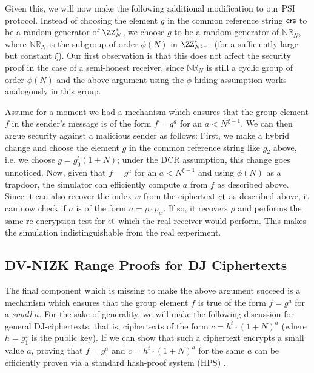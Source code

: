 Given this, we will now make the following additional modification to our PSI protocol. Instead of choosing the element $g$ in the common reference string $\mathsf{crs}$ to be a random generator of $\ZZ_N^\ast$, we choose $g$ to be a random generator of $\mathbb{NR}_N$, where $\mathbb{NR}_N$ is the subgroup of order $\phi(N)$ in $\ZZ_{N^{\xi + 1}}^\ast$ (for a sufficiently large but constant $\xi$). Our first observation is  that this does not affect the security proof in the case of a semi-honest receiver, since $\mathbb{NR}_N$ is still a cyclic group of order $\phi(N)$ and the above argument using the $\phi$-hiding assumption works analogously in this group.

Assume for a moment we had a mechanism which ensures that the group element $f$ in the sender's message is of the form $f = g^a$ for an $a < N^{\xi - 1}$. We can then argue security against a malicious sender as follows: First, we make a hybrid change and choose the element $g$ in the common reference string like $g_2$ above, i.e. we choose $g = g_0^t (1 + N)$; under the DCR assumption, this change goes unnoticed. Now, given that $f = g^a$ for an $a < N^{\xi - 1}$ and using $\phi(N)$ as a trapdoor, the simulator can efficiently compute $a$ from $f$ as described above. Since it can also recover the index $w$ from the ciphertext $\mathsf{ct}$ as described above, it can now check if $a$ is of the form $a = \rho \cdot p_w$. If so, it recovers $\rho$ and performs the same re-encryption test for $\mathsf{ct}$ which the real receiver would perform. This makes the simulation indistinguishable from the real experiment.



\subsection{DV-NIZK Range Proofs for DJ Ciphertexts}
The final component which is missing to make the above argument succeed is a mechanism which ensures that the group element $f$ is true of the form $f = g^a$ for a \emph{small} $a$. For the sake of generality, we will make the following discussion for general DJ-ciphertexts, that is, ciphertexts of the form $c = h^t \cdot (1 + N)^a$ (where $h = g_1^z$ is the public key). If we can show that such a ciphertext encrypts a small value $a$, proving that $f = g^a$ and $c = h^t \cdot (1 + N)^a$ for the same $a$ can be efficiently proven via a standard hash-proof system (HPS) \cite{EC:CraSho02}.

